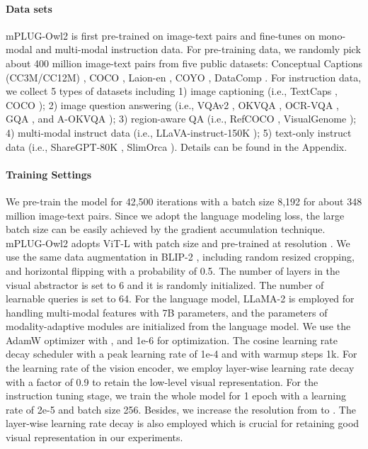 \documentclass[10pt,twocolumn,letterpaper]{article}
\newcommand{\modelname}{mPLUG-Owl2\xspace}
\begin{document}
\paragraph{Data sets} 
\modelname is first pre-trained on image-text pairs and fine-tunes on mono-modal and multi-modal instruction data. For pre-training data, we randomly pick about 400 million image-text pairs from five public datasets: Conceptual Captions (CC3M/CC12M) \cite{changpinyo2021cc3m12m}, COCO \cite{lin2014coco}, Laion-en \cite{schuhmann2022laion}, COYO \cite{kakaobrain2022coyo-700m}, DataComp \cite{gadre2023datacomp}. For instruction data, we collect 5 types of datasets including 1) image captioning (i.e., TextCaps \cite{sidorov2020textcaps}, COCO \cite{lin2014coco}); 2) image question answering (i.e., VQAv2 \cite{balanced_vqa_v2}, OKVQA \cite{marino2019okvqa}, OCR-VQA \cite{mishra2019ocrvqa}, GQA \cite{hudson2019gqa}, and A-OKVQA \cite{schwenk2022aokvqa}); 3) region-aware QA (i.e., RefCOCO \cite{yu2016refcoco}, VisualGenome \cite{krishna2017visualgenome}); 4) multi-modal instruct data (i.e., LLaVA-instruct-150K \cite{Liu2023Llava}); 5) text-only instruct data (i.e., ShareGPT-80K \cite{ShareGPT2023}, SlimOrca \cite{SlimOrca}). Details can be found in the Appendix.

\paragraph{Training Settings}
We pre-train the model for 42,500 iterations with a batch size 8,192 for about 348 million image-text pairs. Since we adopt the language modeling loss, the large batch size can be easily achieved by the gradient accumulation technique. \modelname adopts ViT-L \cite{radford2021clip} with patch size  and pre-trained at resolution . We use the same data augmentation in BLIP-2 \cite{Li2023BLIP2}, including random resized cropping, and horizontal flipping with a probability of 0.5. The number of layers in the visual abstractor is set to 6 and it is randomly initialized. The number of learnable queries is set to 64. For the language model, LLaMA-2 \cite{Touvron2023Llama2} is employed for handling multi-modal features with 7B parameters, and the parameters of modality-adaptive modules are initialized from the language model. We use the AdamW \cite{loshchilov2018adamW} optimizer with ,  and 1e-6 for optimization. The cosine learning rate decay scheduler with a peak learning rate of 1e-4 and with warmup steps 1k. For the learning rate of the vision encoder, we employ layer-wise learning rate decay with a factor of 0.9 to retain the low-level visual representation. For the instruction tuning stage, we train the whole model for 1 epoch with a learning rate of 2e-5 and batch size 256. Besides, we increase the resolution from  to . The layer-wise learning rate decay is also employed which is crucial for retaining good visual representation in our experiments.
\end{document}
